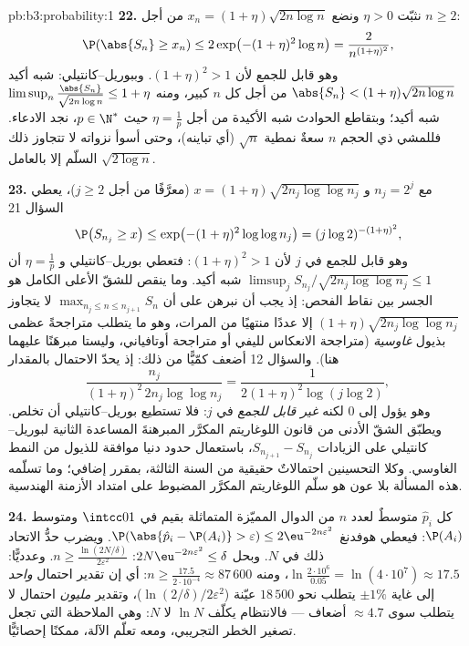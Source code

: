 \begin{solution}{pb:b3:probability:1}
\textbf{22.} نثبّت $\eta > 0$ ونضع $x_n = (1 +
\eta)\sqrt{2n\log n}$ من أجل $n \geq 2$:
\[
\P(\abs{S_n} \geq x_n) \leq 2\exp\bigl(-(1 +
\eta)^2\log n\bigr) = \frac{2}{n^{(1+\eta)^2}},
\]
وهو قابل للجمع لأن $(1 + \eta)^2 > 1$. وببوريل--كانتيلي: شبه أكيد $\abs{S_n} < (1 + \eta)\sqrt{2n\log n}$
من أجل كل $n$ كبير، ومنه $\limsup_n\frac{\abs{S_n}}{\sqrt{2n\log n}} \leq 1 +
\eta$ شبه أكيد؛ وبتقاطع الحوادث شبه
الأكيدة من أجل $\eta =
\frac1p$ حيث $p \in \N^*$، نجد الادعاء. فللمشي
ذي الحجم $n$ سعةٌ نمطية $\sqrt n$ (أي تباينه)، وحتى أسوأ نزواته
لا تتجاوز ذلك السلّم إلا بالعامل $\sqrt{2\log n}$.

\textbf{23.} مع $n_j = 2^j$ و $x = (1 +
\eta)\sqrt{2n_j\log\log n_j}$ (معرَّفًا من أجل
$j \geq 2$)، يعطي السؤال 21
\[
\P\bigl(S_{n_j} \geq x\bigr) \leq \exp\bigl(-(1 +
\eta)^2\log\log n_j\bigr) = (j\log 2)^{-(1+\eta)^2},
\]
وهو قابل للجمع في $j$ لأن $(1 + \eta)^2 > 1$: فتعطي بوريل--كانتيلي و
$\eta = \frac1p$ أن $\limsup_jS_{n_j}/\sqrt{2n_j
\log\log n_j} \leq 1$ شبه أكيد. وما ينقص للشقّ الأعلى
الكامل هو الجسر بين نقاط الفحص: إذ يجب أن نبرهن على أن $\max_{n_j\leq n\leq n_{j+1}}S_n$
لا يتجاوز $(1+\eta)\sqrt{2n_j\log\log n_j}$ إلا عددًا منتهيًا من المرات، وهو ما يتطلب
متراجحةً عظمى بذيول \emph{غاوسية} (متراجحة الانعكاس لليفي أو
متراجحة أوتافياني، وليستا مبرهَنًا عليهما هنا). والسؤال 12 أضعف
كمّيًّا من ذلك: إذ يحدّ الاحتمال بالمقدار
\[
\frac{n_j}{(1+\eta)^2\,2n_j\log\log n_j}
= \frac{1}{2(1+\eta)^2\log(j\log2)},
\]
وهو يؤول إلى $0$ لكنه \emph{غير قابل للجمع} في $j$: فلا تستطيع
بوريل--كانتيلي أن تخلص. ويطبّق الشقّ الأدنى من قانون اللوغاريتم
المكرَّر المبرهنةَ المساعدة الثانية لبوريل--كانتيلي على
الزيادات  $S_{n_{j+1}} - S_{n_j}$، باستعمال حدود دنيا موافقة للذيول من
النمط الغاوسي. وكلا التحسينين احتمالاتٌ حقيقية من السنة
الثالثة، بمقرر إضافي؛ وما تسلّمه هذه المسألة بلا عون هو سلّم
اللوغاريتم المكرَّر المضبوط على امتداد الأزمنة الهندسية.

\textbf{24.} كل $\hat p_i$ متوسطٌ لعدد $n$ من الدوال المميّزة
 المتماثلة بقيم في $\intcc01$ ومتوسط $\P(A_i)$: فيعطي
هوفدنغ $\P(\abs{\hat p_i - \P(A_i)} >
\varepsilon) \leq 2\eu^{-2n\varepsilon^2}$. ويضرب حدُّ الاتحاد ذلك في $N$. وبحل $2N\eu^{-2n\varepsilon^2} \leq
\delta$:
$n \geq \frac{\ln(2N/\delta)}{2\varepsilon^2}$. وعدديًّا: $\ln\frac{2\cdot10^6}{0.05} =
\ln(4\cdot10^7) \approx 17.5$، ومنه $n \geq
\frac{17.5}{2\cdot10^{-4}} \approx 87\,600$: أي إن تقدير احتمال
\emph{واحد} إلى غاية $\pm1\%$ يتطلب نحو $18\,500$ عيّنة
($\ln(2/\delta)/2\varepsilon^2$)، وتقدير \emph{مليون} احتمال لا يتطلب سوى $\approx 4.7$
أضعاف --- فالانتظام يكلّف $\ln N$ لا $N$: وهي الملاحظة التي
تجعل تصغير الخطر التجريبي، ومعه تعلّم الآلة، ممكنًا إحصائيًّا.


\end{solution}
